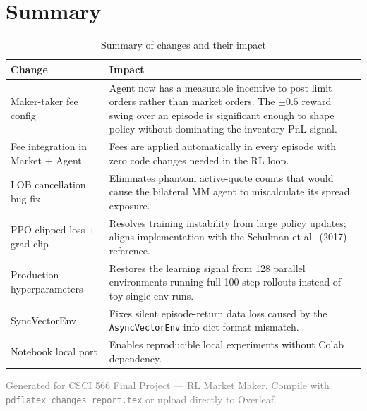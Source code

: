 \documentclass[11pt,a4paper]{article}
\begin{document}
\section{Summary}

\begin{table}[h!]
\centering
\renewcommand{\arraystretch}{1.4}
\begin{tabularx}{\linewidth}{lX}
\toprule
\textbf{Change} & \textbf{Impact} \\
\midrule
Maker-taker fee config & Agent now has a measurable incentive to post
                         limit orders rather than market orders.
                         The $\pm 0.5$ reward swing over an episode is
                         significant enough to shape policy without
                         dominating the inventory PnL signal. \\
\addlinespace
Fee integration in Market + Agent & Fees are applied automatically in
                                    every episode with zero code changes
                                    needed in the RL loop. \\
\addlinespace
LOB cancellation bug fix & Eliminates phantom active-quote counts that
                            would cause the bilateral MM agent to
                            miscalculate its spread exposure. \\
\addlinespace
PPO clipped loss + grad clip & Resolves training instability from large
                               policy updates; aligns implementation with
                               the Schulman et al.\ (2017) reference. \\
\addlinespace
Production hyperparameters & Restores the learning signal from 128
                             parallel environments running full 100-step
                             rollouts instead of toy single-env runs. \\
\addlinespace
SyncVectorEnv & Fixes silent episode-return data loss caused by the
                \texttt{AsyncVectorEnv} info dict format mismatch. \\
\addlinespace
Notebook local port & Enables reproducible local experiments without
                      Colab dependency. \\
\bottomrule
\end{tabularx}
\caption{Summary of changes and their impact}
\end{table}

\vfill
\noindent\textcolor{gray}{\small
Generated for CSCI 566 Final Project — RL Market Maker.
Compile with \texttt{pdflatex changes\_report.tex} or upload directly to Overleaf.}
\end{document}
